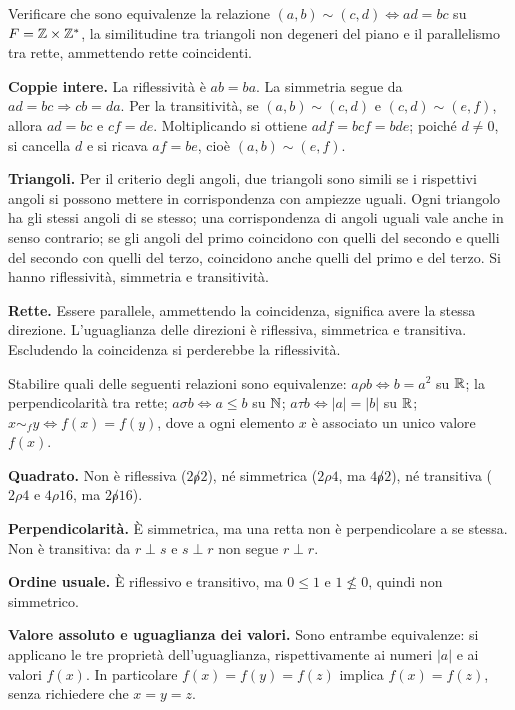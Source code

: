\begin{esercizio}
Verificare che sono equivalenze la relazione $(a,b)\sim(c,d)\iff ad=bc$ su $F=\mathbb{Z}\times\mathbb{Z}^*$, la similitudine tra triangoli non degeneri del piano e il parallelismo tra rette, ammettendo rette coincidenti.
\end{esercizio}
\begin{svolgimento}
\textbf{Coppie intere.} La riflessività è $ab=ba$. La simmetria segue da $ad=bc\Rightarrow cb=da$. Per la transitività, se $(a,b)\sim(c,d)$ e $(c,d)\sim(e,f)$, allora $ad=bc$ e $cf=de$. Moltiplicando si ottiene $adf=bcf=bde$; poiché $d\ne0$, si cancella $d$ e si ricava $af=be$, cioè $(a,b)\sim(e,f)$.

\textbf{Triangoli.} Per il criterio degli angoli, due triangoli sono simili se i rispettivi angoli si possono mettere in corrispondenza con ampiezze uguali. Ogni triangolo ha gli stessi angoli di se stesso; una corrispondenza di angoli uguali vale anche in senso contrario; se gli angoli del primo coincidono con quelli del secondo e quelli del secondo con quelli del terzo, coincidono anche quelli del primo e del terzo. Si hanno riflessività, simmetria e transitività.

\textbf{Rette.} Essere parallele, ammettendo la coincidenza, significa avere la stessa direzione. L'uguaglianza delle direzioni è riflessiva, simmetrica e transitiva. Escludendo la coincidenza si perderebbe la riflessività.
\end{svolgimento}

\begin{esercizio}
Stabilire quali delle seguenti relazioni sono equivalenze: $a\rho b\iff b=a^2$ su $\mathbb{R}$; la perpendicolarità tra rette; $a\sigma b\iff a\le b$ su $\mathbb{N}$; $a\tau b\iff |a|=|b|$ su $\mathbb{R}$; $x\sim_f y\iff f(x)=f(y)$, dove a ogni elemento $x$ è associato un unico valore $f(x)$.
\end{esercizio}
\begin{svolgimento}
\textbf{Quadrato.} Non è riflessiva ($2\not\rho2$), né simmetrica ($2\rho4$, ma $4\not\rho2$), né transitiva ($2\rho4$ e $4\rho16$, ma $2\not\rho16$).

\textbf{Perpendicolarità.} È simmetrica, ma una retta non è perpendicolare a se stessa. Non è transitiva: da $r\perp s$ e $s\perp r$ non segue $r\perp r$.

\textbf{Ordine usuale.} È riflessivo e transitivo, ma $0\le1$ e $1\nleq0$, quindi non simmetrico.

\textbf{Valore assoluto e uguaglianza dei valori.} Sono entrambe equivalenze: si applicano le tre proprietà dell'uguaglianza, rispettivamente ai numeri $|a|$ e ai valori $f(x)$. In particolare $f(x)=f(y)=f(z)$ implica $f(x)=f(z)$, senza richiedere che $x=y=z$.
\end{svolgimento}

